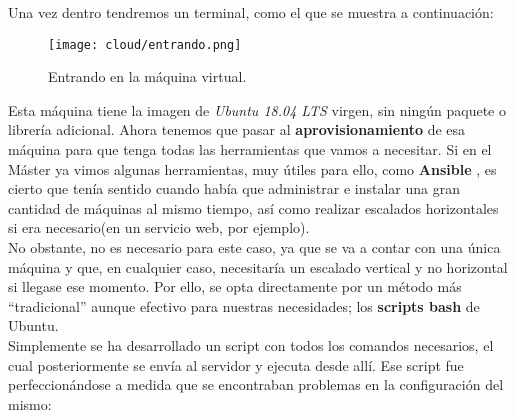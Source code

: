 \documentclass[11pt,fleqn]{book} %
\begin{document}
Una vez dentro tendremos un terminal, como el que se muestra a continuación: 

\begin{figure}[H]
	\centering\texttt{[image: cloud/entrando.png]}
	\caption{Entrando en la máquina virtual.}
	\label{fig:cloudentrando} %
\end{figure} 

Esta máquina tiene la imagen de \textit{Ubuntu 18.04 LTS} virgen, sin ningún paquete o librería adicional. Ahora tenemos que pasar al \textbf{aprovisionamiento} de esa máquina para que tenga todas las herramientas que vamos a necesitar. Si en el Máster ya vimos algunas herramientas, muy útiles para ello, como \textbf{Ansible} \cite{article:ansible}, es cierto que tenía sentido cuando había que administrar e instalar una gran cantidad de máquinas al mismo tiempo, así como realizar escalados horizontales si era necesario(en un servicio web, por ejemplo). \\

No obstante, no es necesario para este caso, ya que se va a contar con una única máquina y que, en cualquier caso, necesitaría un escalado vertical y no horizontal si llegase ese momento. Por ello, se opta directamente por un método más ``tradicional'' aunque efectivo para nuestras necesidades; los \textbf{scripts bash} de Ubuntu. \\

Simplemente se ha desarrollado un script con todos los comandos necesarios, el cual posteriormente se envía al servidor y ejecuta desde allí. Ese script fue perfeccionándose a medida que se encontraban problemas en la configuración del mismo: \\
\end{document}
